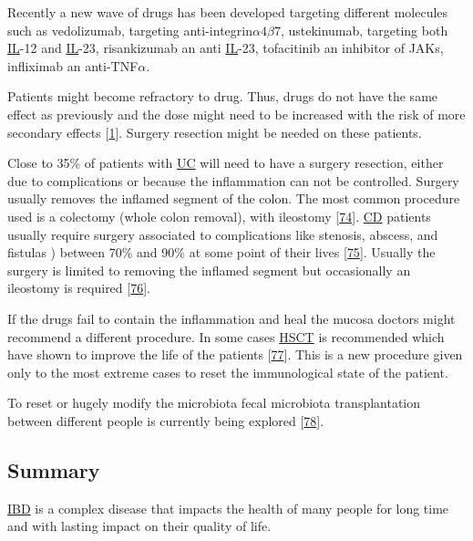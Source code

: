 \documentclass[
  12pt,
  a4paper,
  twoside,
  openright]{book}
\begin{document}
Recently a new wave of drugs has been developed targeting different molecules such as vedolizumab, targeting anti-integrin\(\alpha 4 \beta 7\), ustekinumab, targeting both \protect\hyperlink{acronyms_IL}{IL}-12 and \protect\hyperlink{acronyms_IL}{IL}-23, risankizumab an anti \protect\hyperlink{acronyms_IL}{IL}-23, tofacitinib an inhibitor of JAKs, infliximab an anti-TNF\(\alpha\).

Patients might become refractory to drug.
Thus, drugs do not have the same effect as previously and the dose might need to be increased with the risk of more secondary effects {[}\protect\hyperlink{ref-raine2021}{1}{]}.
Surgery resection might be needed on these patients.

Close to 35\% of patients with \protect\hyperlink{acronyms_UC}{UC} will need to have a surgery resection, either due to complications or because the inflammation can not be controlled.
Surgery usually removes the inflamed segment of the colon.
The most common procedure used is a colectomy (whole colon removal), with ileostomy {[}\protect\hyperlink{ref-hwang2008}{74}{]}.
\protect\hyperlink{acronyms_CD}{CD} patients usually require surgery associated to complications like stenosis, abscess, and fistulas ) between 70\% and 90\% at some point of their lives {[}\protect\hyperlink{ref-gardiner2007}{75}{]}.
Usually the surgery is limited to removing the inflamed segment but occasionally an ileostomy is required {[}\protect\hyperlink{ref-lewis2010}{76}{]}.

If the drugs fail to contain the inflammation and heal the mucosa doctors might recommend a different procedure.
In some cases \protect\hyperlink{acronyms_HSCT}{HSCT} is recommended which have shown to improve the life of the patients {[}\protect\hyperlink{ref-corralizab}{77}{]}.
This is a new procedure given only to the most extreme cases to reset the immunological state of the patient.

To reset or hugely modify the microbiota fecal microbiota transplantation between different people is currently being explored {[}\protect\hyperlink{ref-weingarden2017}{78}{]}.

\hypertarget{summary-ibd}{%
\subsection{Summary}\label{summary-ibd}}

\protect\hyperlink{acronyms_IBD}{IBD} is a complex disease that impacts the health of many people for long time and with lasting impact on their quality of life.
\end{document}
